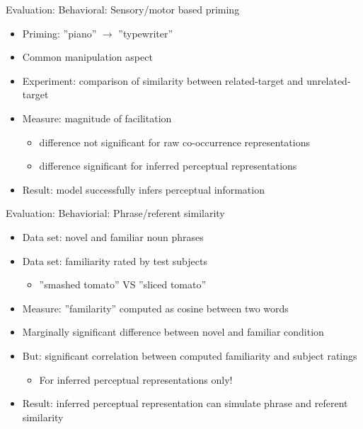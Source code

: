 \documentclass[12pt,a4paper]{beamer}
\begin{document}
\begin{frame}{Evaluation: Behavioral: Sensory/motor based priming}
\begin{itemize}
\item Priming: ''piano'' $\to$ ''typewriter''
\item Common manipulation aspect
\item Experiment: comparison of similarity between related-target and unrelated-target
\item Measure: magnitude of facilitation
    \begin{itemize}
    \item difference not significant for raw co-occurrence representations
    \item difference significant for inferred perceptual representations
    \end{itemize}
\item Result: model successfully infers perceptual information
\end{itemize}
\end{frame}


\begin{frame}{Evaluation: Behaviorial: Phrase/referent similarity}
\begin{itemize}
\item Data set: novel and familiar noun phrases 
\item Data set: familiarity rated by test subjects
    \begin{itemize}
    \item ''smashed tomato'' VS ''sliced tomato''
    \end{itemize}
\item Measure: ''familarity'' computed as cosine between two words
\item Marginally significant difference between novel and familiar condition
\item But: significant correlation between computed familiarity and subject ratings %
    \begin{itemize}
    \item For inferred perceptual representations only!
    \end{itemize}
\item Result: inferred perceptual representation can simulate phrase and referent similarity
\end{itemize}
\end{frame}
\end{document}
